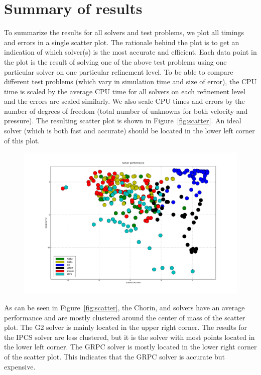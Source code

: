 \section{Summary of results}

To summarize the results for all solvers and test problems, we plot
all timings and errors in a single scatter plot. The rationale behind
the plot is to get an indication of which solver(s) is the most
accurate and efficient. Each data point in the plot is the result of
solving one of the above test problems using one particular solver on
one particular refinement level. To be able to compare different test
problems (which vary in simulation time and size of error), the CPU
time is scaled by the average CPU time for all solvers on each
refinement level and the errors are scaled similarly. We also scale
CPU times and errors by the number of degrees of freedom (total number
of unknowns for both velocity and pressure). The resulting scatter
plot is shown in Figure~\ref{fig:scatter}. An ideal solver (which is
both fast and accurate) should be located in the lower left corner of
this plot.

\begin{figure}
  {\includegraphics[width=\fullfig]{chapters/kvs-1/pdf/new_scatter.pdf}}
\end{figure}

As can be seen in Figure~\ref{fig:scatter}, the Chorin,  and
 solvers have an average performance and are mostly clustered
around the center of mass of the scatter plot. The G2 solver is mainly
located in the upper right corner. The results for the IPCS solver are
less clustered, but it is the solver with most points located in the
lower left corner. The GRPC solver is mostly located in the lower
right corner of the scatter plot. This indicates that the GRPC solver
is accurate but expensive.

